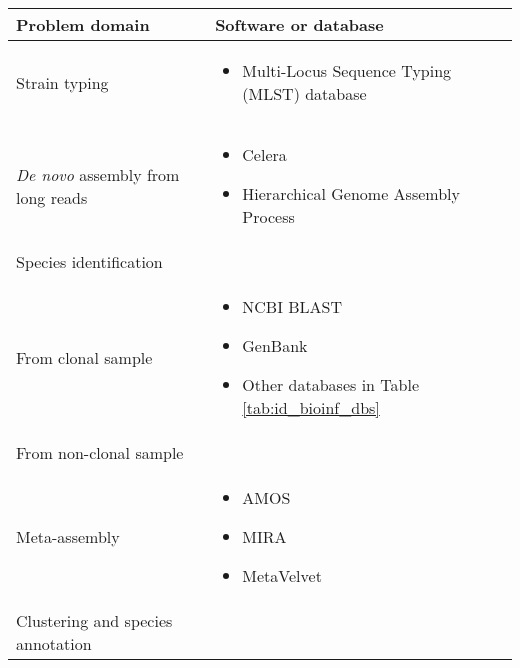 \centering
\small
\begin{tabular}{l l}
  \toprule
  \textbf{Problem domain} & \textbf{Software or database}\\
  \midrule
  Strain typing &
  \begin{minipage}[t]{5cm}
    \raggedright
    \begin{itemize}[noitemsep]
    \item Multi-Locus Sequence Typing (MLST) database
    \end{itemize}
    \smallskip
  \end{minipage}
  \\
  \textit{De novo} assembly from long reads &
  \begin{minipage}[t]{5cm}
    \raggedright
    \begin{itemize}[noitemsep]
    \item Celera
    \item Hierarchical Genome Assembly Process
    \end{itemize}
  \end{minipage}
  \\
  Species identification &
  \\
  \-\tabindent From clonal sample &
  \begin{minipage}[t]{5cm}
    \raggedright
    \begin{itemize}[noitemsep]
    \item NCBI BLAST
    \item GenBank
    \item Other databases in Table \ref{tab:id_bioinf_dbs}
    \end{itemize}
  \end{minipage}
  \\
  \-\tabindent From non-clonal sample &
  \\
  \-\tabindent\tabindent  Meta-assembly &
  \begin{minipage}[t]{5cm}
    \raggedright
    \begin{itemize}[noitemsep]
    \item AMOS
    \item MIRA
    \item MetaVelvet
    \end{itemize}
    \smallskip
  \end{minipage}
  \\
  \-\tabindent\tabindent Clustering and species annotation &
  \begin{minipage}[t]{5cm}
    \raggedright
    \begin{itemize}[noitemsep]

\end{itemize}
\end{minipage}
\end{tabular}
